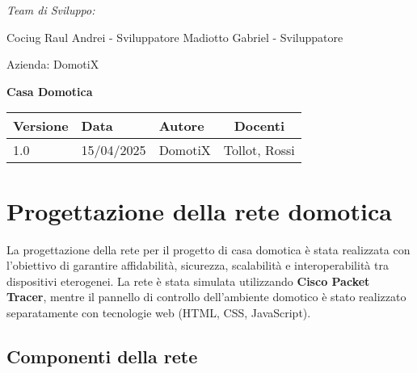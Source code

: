 \documentclass[a4paper,12pt]{article}
\begin{document}
\begin{titlepage}
    \begin{minipage}[t]{0.4\textwidth}
    \raggedright
    {\large\itshape Team di Sviluppo:\par}
    \vspace{0.2cm}
    
    Cociug Raul Andrei - Sviluppatore 
    Madiotto Gabriel - Sviluppatore
    \end{minipage}
    \hfill
    \begin{minipage}[t]{0.4\textwidth}
    \raggedleft
    {\Large Azienda: DomotiX\par}
    \end{minipage}
    
    \centering
    \vspace*{5cm}
    
    {\Huge\bfseries Casa Domotica\par}
    \vspace{1.5cm}
    
    \vfill
    
    \begin{table}[h]
    \centering
    \begin{tabular}{@{}lllc@{}}
    \toprule
    Versione & Data & Autore & Docenti \\  
    \midrule
    1.0 & 15/04/2025 & DomotiX & Tollot, Rossi \\
    \bottomrule
    \end{tabular}
    \end{table}
    
    \thispagestyle{empty}
\end{titlepage}
\tableofcontents
\newpage

\section{Progettazione della rete domotica}

La progettazione della rete per il progetto di casa domotica è stata realizzata con l’obiettivo di garantire affidabilità, sicurezza, scalabilità e interoperabilità tra dispositivi eterogenei. La rete è stata simulata utilizzando \textbf{Cisco Packet Tracer}, mentre il pannello di controllo dell’ambiente domotico è stato realizzato separatamente con tecnologie web (HTML, CSS, JavaScript).

\subsection{Componenti della rete}
\end{document}
